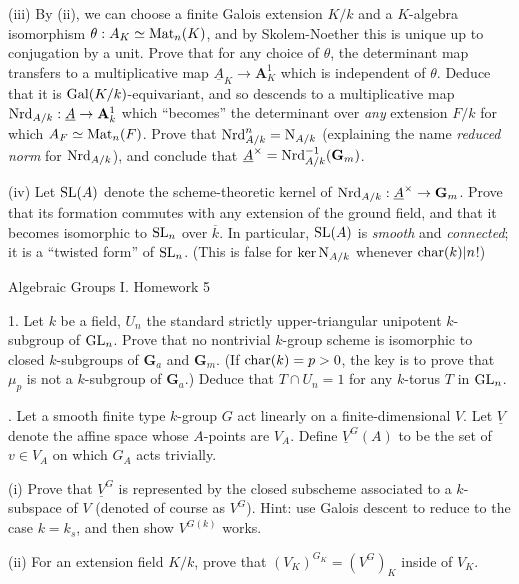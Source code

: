 \documentclass[10pt]{amsart}
\begin{document}
(iii) By (ii), we can choose a finite Galois extension $K/k$ and a $K$-algebra isomorphism
$\theta:A_K \simeq {\rm{Mat}}_n(K)$, and by Skolem-Noether this is unique up to conjugation by a unit.
Prove that for any choice of $\theta$, the determinant map
transfers to a multiplicative map $\underline{A}_K \rightarrow \mathbf{A}^1_K$
which is independent of $\theta$.  Deduce that it is ${\rm{Gal}}(K/k)$-equivariant,
and so descends to a multiplicative map ${\rm{Nrd}}_{A/k}:\underline{A} \rightarrow \mathbf{A}^1_k$
which ``becomes'' the determinant over {\em any} extension $F/k$ for which $A_F \simeq
{\rm{Mat}}_n(F)$.  Prove that ${\rm{Nrd}}_{A/k}^n = {\rm{N}}_{A/k}$ 
(explaining the name {\em reduced norm}
for ${\rm{Nrd}}_{A/k}$), and conclude that $\underline{A}^{\times} = 
{\rm{Nrd}}_{A/k}^{-1}(\mathbf{G}_m)$.  

(iv)  Let ${\rm{SL}}(A)$ denote the scheme-theoretic kernel of 
${\rm{Nrd}}_{A/k}:\underline{A}^{\times} \rightarrow \mathbf{G}_m$.  Prove that its formation
commutes with any extension of the ground field, and that it 
becomes isomorphic to ${\rm{SL}}_n$ over $\overline{k}$.  In particular,
${\rm{SL}}(A)$ is {\em smooth} and {\em connected}; it is a ``twisted form'' of
${\rm{SL}}_n$.  (This is false for $\ker {\rm{N}}_{A/k}$
whenever ${\rm{char}}(k)|n$!)  

\newpage

\centerline{\sc Algebraic Groups I. Homework 5}

1.  Let $k$ be a field, $U_n$ the standard strictly upper-triangular unipotent $k$-subgroup of
${\rm{GL}}_n$.   Prove that no nontrivial $k$-group scheme is isomorphic to closed $k$-subgroups of
$\mathbf{G}_a$ and ${\mathbf{G}}_m$.  (If ${\rm{char}}(k) = p > 0$, the key is to prove that $\mu_p$ is not a $k$-subgroup of
$\mathbf{G}_a$.)
Deduce that $T \cap U_n = 1$ for any $k$-torus $T$ in ${\rm{GL}}_n$.

\medskip{}. Let a smooth finite type $k$-group $G$ act
linearly on a finite-dimensional $V$.  Let $\underline{V}$ denote the affine space
whose $A$-points are $V_A$.  Define
$\underline{V}^G(A)$ to be the set of
$v \in V_A$ on which $G_A$ acts trivially. 

(i) Prove that $\underline{V}^G$ is represented by the closed subscheme 
associated to a $k$-subspace of $V$ (denoted of course as $V^G$).  Hint:  use Galois descent to reduce
to the case $k = k_s$, and then show $V^{G(k)}$ works.

(ii) For an extension field $K/k$, prove that $(V_K)^{G_K} = (V^G)_K$ inside of $V_K$. 
\end{document}

